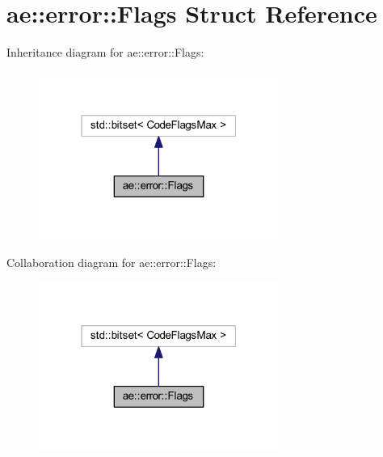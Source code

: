 \hypertarget{structae_1_1error_1_1_flags}{}\section{ae\+:\+:error\+:\+:Flags Struct Reference}
\label{structae_1_1error_1_1_flags}


Inheritance diagram for ae\+:\+:error\+:\+:Flags\+:\nopagebreak
\begin{figure}[H]
\begin{center}
\leavevmode
\includegraphics[width=223pt]{structae_1_1error_1_1_flags__inherit__graph}
\end{center}
\end{figure}


Collaboration diagram for ae\+:\+:error\+:\+:Flags\+:\nopagebreak
\begin{figure}[H]
\begin{center}
\leavevmode
\includegraphics[width=223pt]{structae_1_1error_1_1_flags__coll__graph}
\end{center}
\end{figure}

